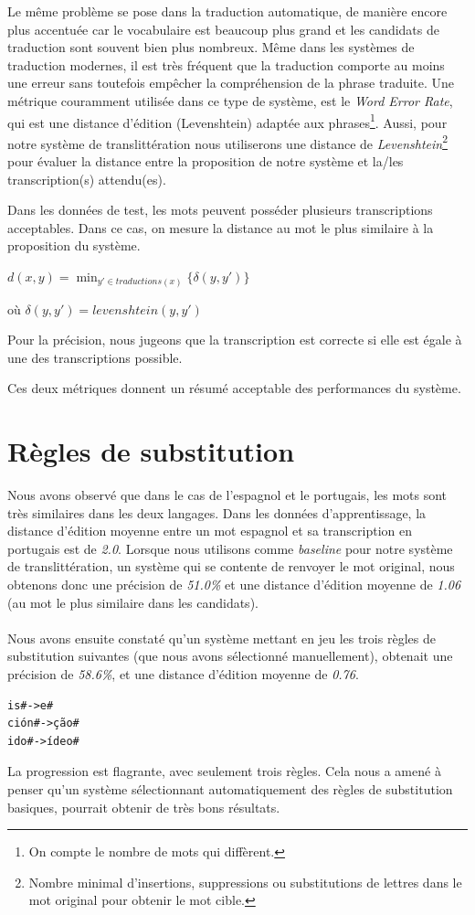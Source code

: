 \documentclass{article}
\begin{document}
Le même problème se pose dans la traduction automatique, de manière encore plus accentuée car le vocabulaire est beaucoup plus grand et les candidats de traduction sont souvent bien plus nombreux. Même dans les systèmes de traduction modernes, il est très fréquent que la traduction comporte au moins une erreur sans toutefois empêcher la compréhension de la phrase traduite. Une métrique couramment utilisée dans ce type de système, est le \emph{Word Error Rate}, qui est une distance d'édition (Levenshtein) adaptée aux phrases\footnote{On compte le nombre de mots qui diffèrent.}.
Aussi, pour notre système de translittération nous utiliserons une distance de \emph{Levenshtein}\footnote{Nombre minimal d'insertions, suppressions ou substitutions de lettres dans le mot original pour obtenir le mot cible.} pour évaluer la distance entre la proposition de notre système et la/les transcription(s) attendu(es).

Dans les données de test, les mots peuvent posséder plusieurs transcriptions acceptables. Dans ce cas, on mesure la distance au mot le plus similaire à la proposition du système.

$d(x,y) = \min_{y' \in traductions(x)} \{\delta(y,y')\}$

où $\delta(y,y')=levenshtein(y,y')$

Pour la précision, nous jugeons que la transcription est correcte si elle est égale à une des transcriptions possible.

Ces deux métriques donnent un résumé acceptable des performances du système.

\section{Règles de substitution}
Nous avons observé que dans le cas de l'espagnol et le portugais, les mots sont très similaires dans les deux langages. Dans les données d'apprentissage, la distance d'édition moyenne entre un mot espagnol et sa transcription en portugais est de \emph{2.0}.
Lorsque nous utilisons comme \emph{baseline} pour notre système de translittération, un système qui se contente de renvoyer le mot original, nous obtenons donc une précision de \emph{51.0\%} et une distance d'édition moyenne de \emph{1.06} (au mot le plus similaire dans les candidats).

\paragraph{}
Nous avons ensuite constaté qu'un système mettant en jeu les trois règles de substitution suivantes (que nous avons sélectionné manuellement), obtenait une précision de \emph{58.6\%}, et une distance d'édition moyenne de \emph{0.76}.
\begin{verbatim}
is#->e#
ción#->ção#
ido#->ídeo#
\end{verbatim}
La progression est flagrante, avec seulement trois règles. Cela nous a amené à penser qu'un système sélectionnant automatiquement des règles de substitution basiques, pourrait obtenir de très bons résultats.
\end{document}
